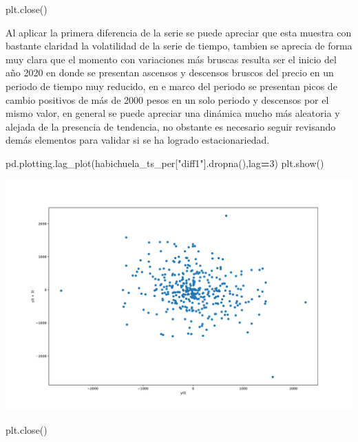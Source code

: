 \documentclass[
]{book}
\newenvironment{Shaded}{\begin{snugshade}}{\end{snugshade}}
\newcommand{\DecValTok}[1]{\textcolor[rgb]{0.00,0.00,0.81}{#1}}
\newcommand{\NormalTok}[1]{#1}
\newcommand{\OperatorTok}[1]{\textcolor[rgb]{0.81,0.36,0.00}{\textbf{#1}}}
\newcommand{\StringTok}[1]{\textcolor[rgb]{0.31,0.60,0.02}{#1}}
\begin{document}
\begin{Shaded}
\begin{Highlighting}[]
\NormalTok{plt.close()}
\end{Highlighting}
\end{Shaded}

Al aplicar la primera diferencia de la serie se puede apreciar que esta muestra con bastante claridad la volatilidad de la serie de tiempo, tambien se aprecia de forma muy clara que el momento con variaciones más bruscas resulta ser el inicio del año 2020 en donde se presentan ascensos y descensos bruscos del precio en un periodo de tiempo muy reducido, en e marco del periodo se presentan picos de cambio positivos de más de 2000 pesos en un solo periodo y descensos por el mismo valor, en general se puede apreciar una dinámica mucho más aleatoria y alejada de la presencia de tendencia, no obstante es necesario seguir revisando demás elementos para validar si se ha logrado estacionariedad.

\begin{Shaded}
\begin{Highlighting}[]

\NormalTok{pd.plotting.lag\_plot(habichuela\_ts\_per[}\StringTok{"diff1"}\NormalTok{].dropna(),lag}\OperatorTok{=}\DecValTok{3}\NormalTok{)}
\NormalTok{plt.show()}
\end{Highlighting}
\end{Shaded}

\includegraphics{bookdown-demo_files/figure-latex/unnamed-chunk-111-95.pdf}

\begin{Shaded}
\begin{Highlighting}[]
\NormalTok{plt.close()}
\end{Highlighting}
\end{Shaded}
\end{document}
